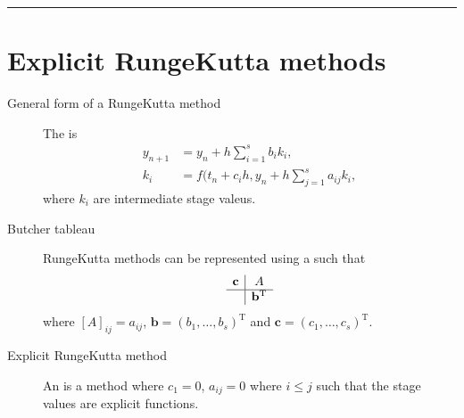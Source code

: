 \documentclass[letterpaper,10pt,english]{jupyterBook}
\begin{document}
\bigskip\hrule\bigskip



\section{Explicit Runge\sphinxhyphen{}Kutta methods}
\label{\detokenize{8_Appendices/8.0_Cheat_sheet:explicit-runge-kutta-methods}}\begin{description}
\item[{General form of a Runge\sphinxhyphen{}Kutta method\label{\detokenize{8_Appendices/8.0_Cheat_sheet:term-General-form-of-a-Runge-Kutta-method}}}] \leavevmode
\sphinxAtStartPar
The {\hyperref[\detokenize{2_ERKs/2.0_ERKs:general-form-of-a-rk-method-section}]{}} is
\begin{align*}
    y_{n+1} &= y_n + h\sum_{i=1}^s b_i k_i, \\
    k_i &= f(t_n + c_ih, y_n + h \sum_{j=1}^s a_{ij} k_i,
\end{align*}
\sphinxAtStartPar
where \(k_i\) are intermediate stage valeus.

\item[{Butcher tableau\label{\detokenize{8_Appendices/8.0_Cheat_sheet:term-Butcher-tableau}}}] \leavevmode
\sphinxAtStartPar
Runge\sphinxhyphen{}Kutta methods can be represented using a {\hyperref[\detokenize{2_ERKs/2.0_ERKs:butcher-tableau-section}]{}} such that
\begin{align*}
    \begin{array}{c|c}
        \mathbf{c} & A \\ \hline
        & \mathbf{b}^\mathrm{T}
    \end{array}
\end{align*}
\sphinxAtStartPar
where \([A]_{ij} = a_{ij}\), \(\mathbf{b} = (b_1, \ldots, b_s)^\mathrm{T}\) and \(\mathbf{c} = (c_1, \ldots, c_s)^\mathrm{T}\).

\item[{Explicit Runge\sphinxhyphen{}Kutta method\label{\detokenize{8_Appendices/8.0_Cheat_sheet:term-Explicit-Runge-Kutta-method}}}] \leavevmode
\sphinxAtStartPar
An {\hyperref[\detokenize{2_ERKs/2.0_ERKs:explicit-and-implicit-rk-methods-section}]{}} is a method where \(c_1 = 0\), \(a_{ij} = 0\) where \(i \leq j\) such that the stage values are explicit functions.


\end{description}
\end{document}
